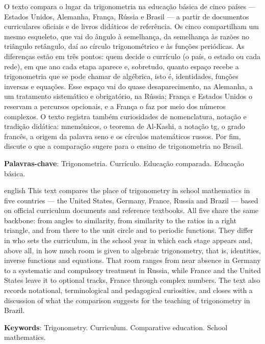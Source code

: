 \documentclass[
    article,
    12pt,
    a4paper,
    sumario=tradicional
]{abntex2}
\begin{document}
\maketitle

\begin{resumoumacoluna}
O texto compara o lugar da trigonometria na educação básica de cinco países
--- Estados Unidos, Alemanha, França, Rússia e Brasil --- a partir de documentos
curriculares oficiais e de livros didáticos de referência. Os cinco
compartilham um mesmo esqueleto, que vai do ângulo à semelhança, da semelhança
às razões no triângulo retângulo, daí ao círculo trigonométrico e às funções
periódicas. As diferenças estão em três pontos: quem decide o currículo (o
país, o estado ou cada rede), em que ano cada etapa aparece e, sobretudo,
quanto espaço recebe a trigonometria que se pode chamar de algébrica, isto é,
identidades, funções inversas e equações. Esse espaço vai do quase
desaparecimento, na Alemanha, a um tratamento sistemático e obrigatório, na
Rússia; França e Estados Unidos o reservam a percursos opcionais, e a França o
faz por meio dos números complexos. O texto registra também curiosidades de
nomenclatura, notação e tradição didática: mnemônicos, o teorema de Al-Kashi, a
notação tg, o grado francês, a origem da palavra seno e os círculos
matemáticos russos. Por fim, discute o que a comparação sugere para o ensino de
trigonometria no Brasil.

\vspace{\onelineskip}
\noindent
\textbf{Palavras-chave}: Trigonometria. Currículo. Educação comparada. Educação básica.
\end{resumoumacoluna}

\renewcommand{\resumoname}{Abstract}
\begin{resumoumacoluna}
\begin{otherlanguage*}{english}
This text compares the place of trigonometry in school mathematics in five
countries --- the United States, Germany, France, Russia and Brazil --- based on
official curriculum documents and reference textbooks. All five share the same
backbone: from angles to similarity, from similarity to the ratios in a right
triangle, and from there to the unit circle and to periodic functions. They
differ in who sets the curriculum, in the school year in which each stage
appears and, above all, in how much room is given to algebraic trigonometry,
that is, identities, inverse functions and equations. That room ranges from
near absence in Germany to a systematic and compulsory treatment in Russia,
while France and the United States leave it to optional tracks, France through
complex numbers. The text also records notational, terminological and
pedagogical curiosities, and closes with a discussion of what the comparison
suggests for the teaching of trigonometry in Brazil.

\vspace{\onelineskip}
\noindent
\textbf{Keywords}: Trigonometry. Curriculum. Comparative education. School mathematics.
\end{otherlanguage*}
\end{resumoumacoluna}
\end{document}
